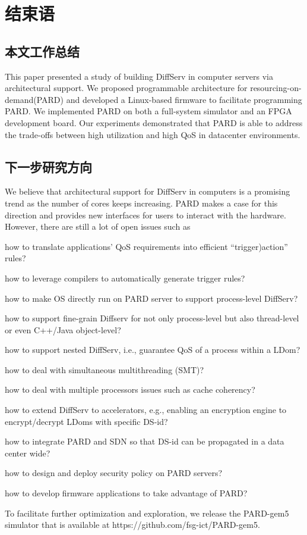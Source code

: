 

\chapter{结束语}
\label{cha:concl}

\section{本文工作总结}
This paper presented a study of building DiffServ in computer
servers via architectural support. We proposed programmable
architecture for resourcing-on-demand(PARD) and developed a
Linux-based firmware to facilitate programming PARD. We implemented
PARD on both a full-system simulator and an FPGA
development board. Our experiments demonstrated that PARD is
able to address the trade-offs between high utilization and high
QoS in datacenter environments.


\section{下一步研究方向}

We believe that architectural support for DiffServ in computers
is a promising trend as the number of cores keeps increasing. PARD
makes a case for this direction and provides new interfaces for users
to interact with the hardware. However, there are still a lot of open
issues such as

how to translate applications’ QoS requirements into efficient
“trigger)action” rules?

how to leverage compilers to automatically generate trigger
rules?

how to make OS directly run on PARD server to support
process-level DiffServ?

how to support fine-grain Diffserv for not only process-level but
also thread-level or even C++/Java object-level?

how to support nested DiffServ, i.e., guarantee QoS of a process
within a LDom?
 
how to deal with simultaneous multithreading (SMT)?
 
how to deal with multiple processors issues such as cache coherency?

how to extend DiffServ to accelerators, e.g., enabling an encryption
engine to encrypt/decrypt LDoms with specific DS-id?

how to integrate PARD and SDN so that DS-id can be propagated
in a data center wide?

how to design and deploy security policy on PARD servers?

how to develop firmware applications to take advantage of
PARD?

To facilitate further optimization and exploration, we
release the PARD-gem5 simulator that is available at
https://github.com/fsg-ict/PARD-gem5.

